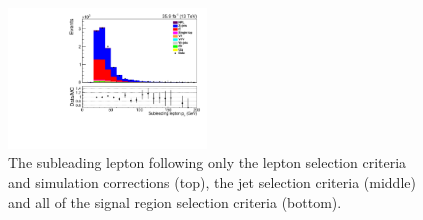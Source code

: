 \begin{figure}[h]
\includegraphics[width=0.47\textwidth]{figs/background-estimation/plots/unblinded/prompt_mumu_ttbarInc/lep2Pt_NPL_mumu_wMass_mumu.pdf}
\caption{
The subleading lepton \pT following only the lepton selection criteria and simulation corrections (top), the jet selection criteria (middle) and all of the signal region selection criteria (bottom).
}
\label{fig:SR_lep2Pt}
\end{figure}

